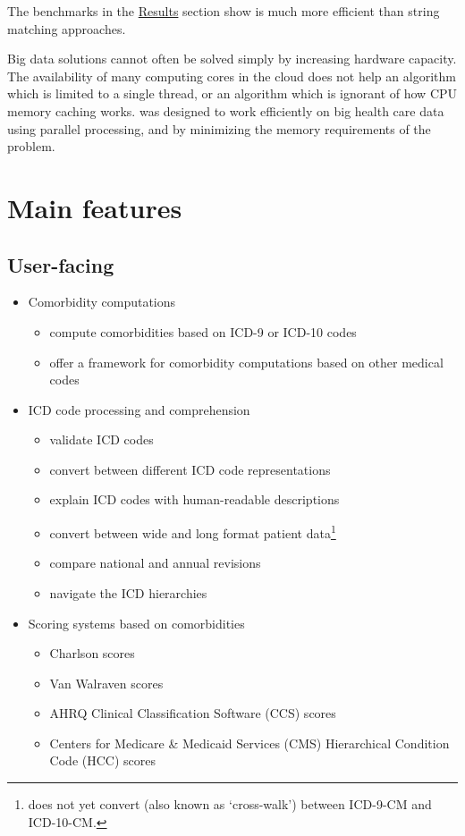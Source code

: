 \documentclass[article]{jss}
\providecommand{\tightlist}{%
  \setlength{\itemsep}{0pt}\setlength{\parskip}{0pt}}
\begin{document}
The benchmarks in the \protect\hyperlink{results}{Results} section show
 is much more efficient than string matching approaches.

Big data solutions cannot often be solved simply by increasing hardware
capacity. The availability of many computing cores in the cloud does not
help an algorithm which is limited to a single thread, or an algorithm
which is ignorant of how CPU memory caching works.  was
designed to work efficiently on big health care data using parallel
processing, and by minimizing the memory requirements of the problem.

\hypertarget{main-features}{%
\section{Main features}\label{main-features}}

\hypertarget{user-facing}{%
\subsection{User-facing}\label{user-facing}}

\begin{itemize}
\tightlist
\item
  Comorbidity computations

  \begin{itemize}
  \tightlist
  \item
    compute comorbidities based on ICD-9 or ICD-10 codes
  \item
    offer a framework for comorbidity computations based on other
    medical codes
  \end{itemize}
\item
  ICD code processing and comprehension

  \begin{itemize}
  \tightlist
  \item
    validate ICD codes
  \item
    convert between different ICD code representations
  \item
    explain ICD codes with human-readable descriptions
  \item
    convert between wide and long format patient data\footnote{
      does not yet convert (also known as `cross-walk') between ICD-9-CM
      and ICD-10-CM.}
  \item
    compare national and annual revisions
  \item
    navigate the ICD hierarchies
  \end{itemize}
\item
  Scoring systems based on comorbidities

  \begin{itemize}
  \tightlist
  \item
    Charlson scores
  \item
    Van Walraven scores
  \item
    AHRQ Clinical Classification Software (CCS) scores
  \item
    Centers for Medicare \& Medicaid Services (CMS) Hierarchical
    Condition Code (HCC) scores
  \end{itemize}
\end{itemize}
\end{document}
